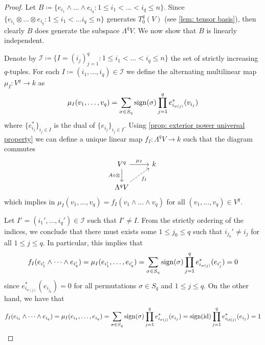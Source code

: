 \begin{proof}
    Let \(B \coloneq \{e_{i_1} \wedge \dots \wedge e_{i_q} \colon 1 \leq i_1 < \dots < i_q
    \leq n\}\). Since \(\{e_{i_1} \otimes \dots \otimes e_{i_q} \colon 1 \leq i_1 <
    \dots i_q \leq n\}\) generates \(T_0^q(V)\) (see \cref{lem: tensor basis}),
    then clearly \(B\) does generate the subspace \(\Lambda^q V\). We now show
    that \(B\) is linearly independent.

    Denote by \(\mathcal I \coloneq \{I = (i_j)_{j=1}^q \colon 1 \leq i_1 < \dots < i_q \leq
    n\}\) the set of strictly increasing \(q\)-tuples. For each \(I \coloneq (i_1,
    \dots, i_q) \in \mathcal I\) we define the alternating multilinear map \(\mu_I
    : V^q \to k\) as
    \[
        \mu_I(v_1, \dots, v_q) = \sum_{\sigma \in S_q}
        \operatorname{sign}(\sigma) \prod_{j=1}^q e_{i_{\sigma(j)}}^*(v_{i_j})
    \]
    where \(\{e_{i_j}^*\}_{i_j \in I}\) is the dual of \(\{e_{i_j}\}_{i_j
    \in I}\). Using \cref{prop: exterior power universal property} we can
    define a unique linear map \(f_I: \Lambda^q V \to k\) such that the diagram
    commutes
    \[
        \begin{tikzcd}
            V^q \ar[r, "\mu_I"] \ar[d, swap, "A \circ \otimes"] &k \\
            \Lambda^q V \ar[ur, dashed, swap, "f_I"]
        \end{tikzcd}
    \]
    which implies in \(\mu_I(v_1, \dots, v_q) = f_I(v_1 \wedge \dots \wedge v_q)\)
    for all \((v_1, \dots, v_q) \in V^q\).

    Let \(I' = (i_1', \dots, i_q') \in \mathcal I\) such that \(I' \neq I\). From
    the strictly ordering of the indices, we conclude that there must exists some
    \(1 \leq j_0 \leq q\) such that \(i_{j_0}' \neq i_j\) for all \(1 \leq j \leq
    q\). In particular, this implies that
    \[
        f_I(e_{i_1'} \wedge \dots \wedge e_{i_q'}) = \mu_I(e_{i_1'}, \dots,
        e_{i_q'}) = \sum_{\sigma \in S_q} \operatorname{sign}(\sigma)
        \prod_{j=1}^q e_{i_{\sigma(j)}}^*(e_{i_j'}) = 0
    \]
    since \(e_{i_{\sigma(j)}}^*(e_{i_{j_0}}) = 0\) for all permutations \(\sigma
    \in S_q\) and \(1 \leq j \leq q\). On the other hand, we have that
    \[
        f_I(e_{i_1} \wedge \dots \wedge e_{i_q}) = \mu_I(e_{i_1}, \dots, e_{i_q})
        = \sum_{\sigma \in S_q} \operatorname{sign}(\sigma) \prod_{j=1}^q
        e_{i_{\sigma(j)}}^*(e_{i_j})
        = \operatorname{sign}(\operatorname{id}) \prod_{j=1}^q e_{i_{\operatorname{id}(j)}}^*(e_{i_j})
        = 1
    \]


\end{proof}
